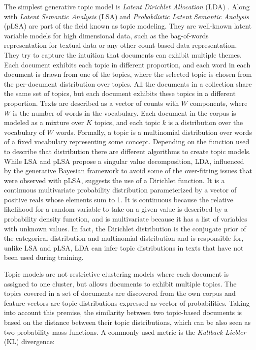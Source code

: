 The simplest generative topic model is \textit{Latent Dirichlet Allocation} (LDA) \citep{Blei2003}. Along with \textit{Latent Semantic Analysis} (LSA) \citep{Deerwester1990} and \textit{Probabilistic Latent Semantic Analysis} (pLSA) \citep{Hofmann2001} are part of the field known as topic modeling. They are well-known latent variable models for high dimensional data, such as the bag-of-words representation for textual data or any other count-based data representation. They try to capture the intuition that documents can exhibit multiple themes. Each document exhibits each topic in different proportion, and each word in each document is drawn from one of the topics, where the selected topic is chosen from the per-document distribution over topics. All the documents in a collection share the same set of topics, but each document exhibits these topics in a different proportion. Texts are described as a vector of counts with $W$ components, where $W$ is the number of words in the vocabulary. Each document in the corpus is modeled as a mixture over $K$ topics, and each topic $k$ is a distribution over the vocabulary of $W$ words. Formally, a topic is a multinomial distribution over words of a fixed vocabulary representing some concept. Depending on the function used to describe that distribution there are different algorithms to create topic models. While LSA and pLSA propose a singular value decomposition, LDA, influenced by the generative Bayesian framework to avoid some of the over-fitting issues that were observed with pLSA, suggests the use of a Dirichlet function. It is a continuous multivariate probability distribution parameterized by a vector of positive reals whose elements sum to 1.  It is continuous because the relative likelihood for a random variable to take on a given value is described by a probability density function, and is multivariate because it has a list of variables with unknown values. In fact, the Dirichlet distribution is the conjugate prior of the categorical distribution and multinomial distribution and is responsible for, unlike LSA and pLSA, LDA can infer topic distributions in texts that have not been used during training.

Topic models are not restrictive clustering models where each document is assigned to one cluster, but allows documents to exhibit multiple topics. The topics covered in a set of documents are discovered from the own corpus and feature vectors are topic distributions expressed as vector of probabilities. Taking into account this premise, the similarity between two topic-based documents is based on the distance between their topic distributions, which can be also seen as two probability mass functions. A commonly used metric is the \textit{Kullback-Liebler} (KL) divergence:

